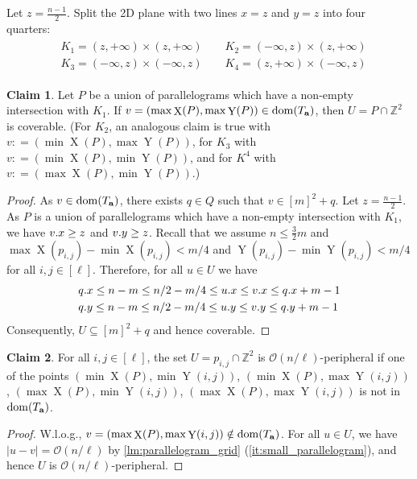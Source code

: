 \documentclass[11pt, letterpaper]{article}
\theoremstyle{plain}
\theoremstyle{definition}
\newtheorem{claim}{Claim}
\theoremstyle{remark}
\newcommand{\Z}{\mathbb{Z}}
\renewcommand{\O}{\mathcal{O}}
\DeclareMathOperator*{\X}{X}
\DeclareMathOperator*{\Y}{Y}
\newcommand{\absolute}[1]{\left\lvert#1\right\rvert}
\begin{document}
Let $z = \frac{n - 1}{2}$. Split the 2D plane with two lines $x = z$ and $y = z$ into four quarters:
\begin{align}
\label{eq:quarters}
\begin{split}
&K_1 = (z, +\infty) \times (z, +\infty) \quad\quad K_2 = (-\infty, z) \times (z, +\infty)\\
&K_3 = (-\infty, z) \times (-\infty, z) \quad\quad K_4 = (z, +\infty) \times (-\infty, z)
\end{split}
\end{align}


\newcommand{\I}{\mathcal{I}}
\newcommand{\G}{\mathcal{G}}
\newcommand{\C}{\mathcal{C}}

\begin{claim}\label{coverable}
Let $P$ be a union of parallelograms which have a non-empty intersection with $K_1$. If $v = (\max \X(P), \max \Y(P)) \in \d{\Ta}$, then $U = P \cap \Z^2$ is coverable. (For $K_2$, an analogous claim is true with $v: = (\min \X(P), \max \Y(P))$, for $K_3$ with $v : = (\min \X(P), \min \Y(P))$, and for $K^4$ with $v : = (\max \X(P), \min \Y(P))$.)
\end{claim}
\begin{proof}
As $v \in \operatorname*{dom}(T_\mathbf{a})$, there exists $q \in Q$ such that $v \in [m]^2 + q$. Let $z = \frac{n - 1}{2}$. As $P$ is a union of parallelograms which have a non-empty intersection with $K_1$, we have $v.x \ge z$ and $v.y \ge z$. Recall that we assume $n \le \frac{3}{2} m$ and $\max \X(p_{i, j}) - \min \X(p_{i, j}) < m / 4$ and $\Y(p_{i, j}) - \min \Y(p_{i, j}) < m / 4$ for all $i, j \in [\ell]$. Therefore, for all $u \in U$ we have
\begin{align}
&q.x \le n-m \le n/2-m/4 \le u.x \le v.x \le q.x + m-1\\
&q.y \le n-m \le n/2-m/4 \le u.y \le v.y \le q.y + m-1 
\end{align}
\noindent Consequently, $U \subseteq [m]^2+q$ and hence coverable.
\end{proof}

\begin{claim}\label{peripheral}
For all $i,j \in [\ell]$, the set $U = p_{i,j} \cap \Z^2$ is $\O(n / \ell)$-peripheral if one of the points $(\min \X(P), \min \Y(i,j))$, $(\min \X(P), \max \Y(i,j))$, $(\max \X(P), \min \Y(i,j))$, $(\max \X(P), \max \Y(i,j))$ is not in $\operatorname*{dom}(T_\mathbf{a})$.
\end{claim}
\begin{proof}
W.l.o.g., $v = (\max \X(P), \max \Y(i,j)) \notin \d{\Ta}$. For all $u \in U$, we have $\absolute{u-v} = \O(n / \ell)$ by \cref{lm:parallelogram_grid} (\ref{it:small_parallelogram}), and hence $U$ is $\O(n / \ell)$-peripheral.
\end{proof}
\end{document}
